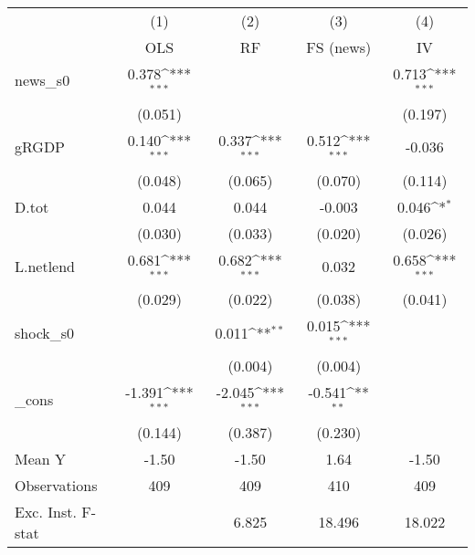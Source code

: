 {
\def\sym#1{\ifmmode^{#1}\else\(^{#1}\)\fi}
\begin{tabular}{l*{4}{c}}
\toprule
            &\multicolumn{1}{c}{(1)}&\multicolumn{1}{c}{(2)}&\multicolumn{1}{c}{(3)}&\multicolumn{1}{c}{(4)}\\
            &\multicolumn{1}{c}{OLS}&\multicolumn{1}{c}{RF}&\multicolumn{1}{c}{FS (news)}&\multicolumn{1}{c}{IV}\\
\midrule
news\_s0     &       0.378\sym{***}&                     &                     &       0.713\sym{***}\\
            &     (0.051)         &                     &                     &     (0.197)         \\
\addlinespace
gRGDP       &       0.140\sym{***}&       0.337\sym{***}&       0.512\sym{***}&      -0.036         \\
            &     (0.048)         &     (0.065)         &     (0.070)         &     (0.114)         \\
\addlinespace
D.tot       &       0.044         &       0.044         &      -0.003         &       0.046\sym{*}  \\
            &     (0.030)         &     (0.033)         &     (0.020)         &     (0.026)         \\
\addlinespace
L.netlend   &       0.681\sym{***}&       0.682\sym{***}&       0.032         &       0.658\sym{***}\\
            &     (0.029)         &     (0.022)         &     (0.038)         &     (0.041)         \\
\addlinespace
shock\_s0    &                     &       0.011\sym{**} &       0.015\sym{***}&                     \\
            &                     &     (0.004)         &     (0.004)         &                     \\
\addlinespace
\_cons      &      -1.391\sym{***}&      -2.045\sym{***}&      -0.541\sym{**} &                     \\
            &     (0.144)         &     (0.387)         &     (0.230)         &                     \\
\midrule
Mean Y      &       -1.50         &       -1.50         &        1.64         &       -1.50         \\
Observations&         409         &         409         &         410         &         409         \\
Exc. Inst. F-stat&                     &       6.825         &      18.496         &      18.022         \\
\bottomrule
\end{tabular}
}

